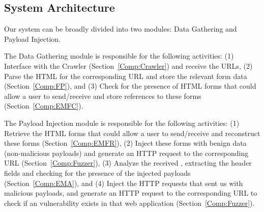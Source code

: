 \subsection{System Architecture}
\label{sys:arch}
Our system can be broadly divided into two modules: Data Gathering and Payload Injection.

The Data Gathering module is responsible for the following activities:
(1) Interface with the Crawler (Section~\ref{Comp:Crawler}) and
receive the URLs, (2) Parse the HTML for the corresponding URL and
store the relevant form data (Section~\ref{Comp:FP}), and (3) Check
for the presence of HTML forms that could allow a user to send/receive
\email and store references to these forms (Section~\ref{Comp:EMFC}).

    
The Payload Injection module is responsible for the following
activities: (1) Retrieve the HTML forms that could allow a user to
send/receive \email and reconstruct these forms
(Section~\ref{Comp:EMFR}), (2) Inject these forms with benign data
(non-malicious payloads) and generate an HTTP request to the
corresponding URL (Section~\ref{Comp:Fuzzer}), (3) Analyze the
received \emails, extracting the \email header fields and checking for
the presence of the injected payloads (Section~\ref{Comp:EMA}), and
(4) Inject the HTTP requests that sent us \emails with malicious
payloads, and generate an HTTP request to the corresponding URL to
check if an \ehi vulnerability exists in that web application
(Section~\ref{Comp:Fuzzer}).


